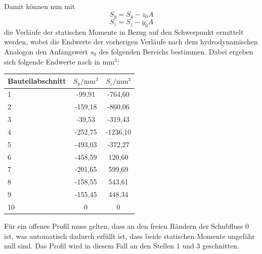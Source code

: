 Damit können nun mit
\begin{equation}
	S_{\bar{y}}=S_y-z_0A
\end{equation} 
\begin{equation}
S_{\bar{z}}=S_z-y_0A
\end{equation} 
die Verläufe der statischen Momente in Bezug auf den Schwerpunkt ermittelt werden, wobei die Endwerte der vorherigen Verläufe nach dem hydrodynamischen Analogon den Anfangswert $s_0$ des folgenden Bereichs bestimmen. Dabei ergeben sich folgende Endwerte nach \cite{TMk} in $\mathrm{mm}^3$:
\begin{center}
\begin{tabular}[h]{l|c|c}
Bauteilabschnitt&$S_{\bar{y}}/\mathrm{mm}^3$&$S_{\bar{z}}/\mathrm{mm}^3$\\
\hline
1&-99,91&-764,60\\
2&-159,18&-860,06\\
3&-39,53&-319,43\\
4&-252,75&-1236,10\\
5&-493,03&-372,27\\
6&-458,59&120,60\\
7&-201,65&599,69\\
8&-158,55&543,61\\
9&-155,45&448,34\\
10&0&0\\
\end{tabular}
\end{center}
Für ein offenes Profil muss gelten, dass an den freien Rändern der Schubfluss $ 0 $ ist, was automatisch dadurch erfüllt ist, dass beide statischen Momente ungefähr null sind. Das Profil wird in diesem Fall an den Stellen 1 und 3 geschnitten.



